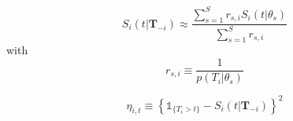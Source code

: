 \documentclass[11pt]{report}
\begin{document}
$$
S_i(t\vert \mathbf{T}_{-i}) \approx \frac{\sum_{s=1}^S r_{s,i} S_i(t\vert \theta_s)}{\sum_{s=1}^S r_{s,i}}
$$
with
$$
r_{s,i} \equiv \frac{1}{p(T_i\vert \theta_s)}
$$

$$
\eta_{i,t} \equiv \left\{ \mathds{1}_{\{T_i > t\}} - S_i(t\vert \mathbf{T}_{-i})\right\}^2
$$
\end{document}
